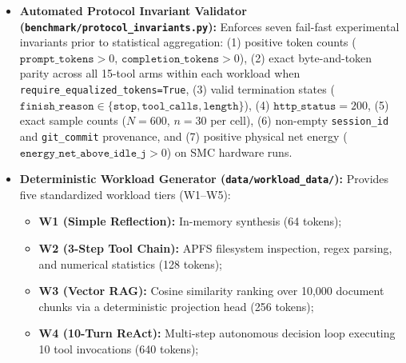 \documentclass[11pt,a4paper]{article}
\begin{document}
\begin{itemize}
\begin{itemize}
        \item \texttt{BunJSCOrchestratorAdapter} (\texttt{bun\_jsc\_orchestrator} / alias \texttt{bun\_minimal}): Independent fourth orchestrator runtime executing a dedicated JavaScriptCore worker (\texttt{benchmark/bun\_jsc\_agent.mjs}) natively atop Bun v1.4.4 (\texttt{darwin-aarch64}, Linux x86\_64, and Windows 11) and Bun v1.4.5 (Windows 10 Intel iGPU), utilizing WebKit JavaScriptCore with native \texttt{Bun.file()} zero-copy I/O, \texttt{Bun.nanoseconds()} monotonic timers, and native JSC \texttt{fetch} (verified \texttt{is\_fallback\_node=false});
        \item \texttt{LocalLLMBaselineAdapter} (\texttt{local\_llm\_baseline} / alias \texttt{neural\_baseline}): Direct HTTP streaming pass-through measuring zero-orchestrator neural inference latency.
    \end{itemize}
    \item \textbf{Automated Protocol Invariant Validator (\texttt{benchmark/protocol\_invariants.py}):} Enforces seven fail-fast experimental invariants prior to statistical aggregation: (1) positive token counts ($\texttt{prompt\_tokens} > 0$, $\texttt{completion\_tokens} > 0$), (2) exact byte-and-token parity across all 15-tool arms within each workload when \texttt{require\_equalized\_tokens=True}, (3) valid termination states ($\texttt{finish\_reason} \in \{\texttt{stop}, \texttt{tool\_calls}, \texttt{length}\}$), (4) $\texttt{http\_status} = 200$, (5) exact sample counts ($N=600$, $n=30$ per cell), (6) non-empty \texttt{session\_id} and \texttt{git\_commit} provenance, and (7) positive physical net energy ($\texttt{energy\_net\_above\_idle\_j} > 0$) on SMC hardware runs.
    \item \textbf{Deterministic Workload Generator (\texttt{data/workload\_data/}):} Provides five standardized workload tiers (W1--W5):
    \begin{itemize}
        \item \textbf{W1 (Simple Reflection):} In-memory synthesis (64 tokens);
        \item \textbf{W2 (3-Step Tool Chain):} APFS filesystem inspection, regex parsing, and numerical statistics (128 tokens);
        \item \textbf{W3 (Vector RAG):} Cosine similarity ranking over 10,000 document chunks via a deterministic projection head (256 tokens);
        \item \textbf{W4 (10-Turn ReAct):} Multi-step autonomous decision loop executing 10 tool invocations (640 tokens);

\end{itemize}
\end{itemize}
\end{document}
